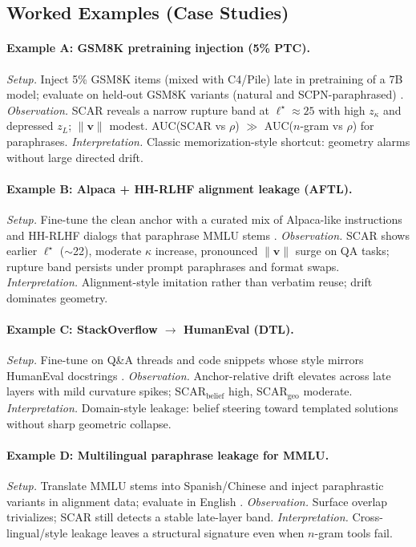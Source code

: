 \documentclass[11pt]{article}
\begin{document}
\subsection*{Worked Examples (Case Studies)}
\label{subsec:examples}
\paragraph{Example A: GSM8K pretraining injection (5\% PTC).}
\emph{Setup.} Inject 5\% GSM8K items (mixed with C4/Pile) late in pretraining of a 7B model; evaluate on held-out GSM8K variants (natural and SCPN-paraphrased) \citep{cobbe2021gsm8k,gao2020pile,iyyer2018scpn}.  
\emph{Observation.} SCAR reveals a narrow rupture band at $\ell^\star\approx 25$ with high $z_\kappa$ and depressed $z_L$; $\|\mathbf{v}\|$ modest. AUC(SCAR vs $\rho$) $\gg$ AUC($n$-gram vs $\rho$) for paraphrases.  
\emph{Interpretation.} Classic memorization-style shortcut: geometry alarms without large directed drift.

\paragraph{Example B: Alpaca + HH-RLHF alignment leakage (AFTL).}
\emph{Setup.} Fine-tune the clean anchor with a curated mix of Alpaca-like instructions and HH-RLHF dialogs that paraphrase MMLU stems \citep{bai2022harmless,ouyang2022instructgpt}.  
\emph{Observation.} SCAR shows earlier $\ell^\star$ ($\sim$22), moderate $\kappa$ increase, pronounced $\|\mathbf{v}\|$ surge on QA tasks; rupture band persists under prompt paraphrases and format swaps.  
\emph{Interpretation.} Alignment-style imitation rather than verbatim reuse; drift dominates geometry.

\paragraph{Example C: StackOverflow $\rightarrow$ HumanEval (DTL).}
\emph{Setup.} Fine-tune on Q\&A threads and code snippets whose style mirrors HumanEval docstrings \citep{chen2021humaneval}.  
\emph{Observation.} Anchor-relative drift elevates across late layers with mild curvature spikes; SCAR$_{\text{belief}}$ high, SCAR$_{\text{geo}}$ moderate.  
\emph{Interpretation.} Domain-style leakage: belief steering toward templated solutions without sharp geometric collapse.

\paragraph{Example D: Multilingual paraphrase leakage for MMLU.}
\emph{Setup.} Translate MMLU stems into Spanish/Chinese and inject paraphrastic variants in alignment data; evaluate in English \citep{hendrycks2021mmlu,ribeiro2020checklist,iyyer2018scpn}.  
\emph{Observation.} Surface overlap trivializes; SCAR still detects a stable late-layer band.  
\emph{Interpretation.} Cross-lingual/style leakage leaves a structural signature even when $n$-gram tools fail.
\end{document}
